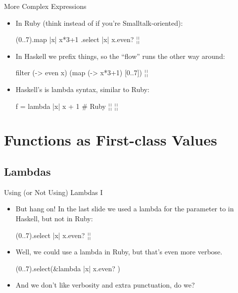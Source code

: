 \documentclass[xcolor=dvipsnames]{beamer}          %
\newcommand{\lO}[1]{\color{Black}{#1}}
\newcommand{\lH}[1]{\color{MidnightBlue}{#1}}
\begin{document}
\begin{frame}[fragile]{More Complex Expressions}
\begin{itemize}
    \item In Ruby (think  instead of  if you're
        Smalltalk-oriented):
        \begin{rlisting}
            (0..7).map { |x| x*3+1 } .select { |x| x.even? }
            ¦\lO{=> [4, 10, 16, 22]}¦
        \end{rlisting}
    \item In Haskell we prefix things, so the ``flow'' runs the other
        way around:
        \begin{hlisting}
            filter (\x -> even x) (map (\x -> x*3+1) [0..7])
            ¦\lO{[4,10,16,22]}¦
        \end{hlisting}
    \item Haskell's  is lambda syntax, similar to Ruby:
        \begin{rlisting}
            f = lambda { |x| x + 1 }     # Ruby
            ¦\lH{f = {\B}x -> x + 1}¦             ¦\lH{\HH Haskell}¦
        \end{rlisting}
\end{itemize}
\end{frame}


\section{Functions as First-class Values}

\subsection{Lambdas}

\begin{frame}[fragile]{Using (or Not Using) Lambdas I}
\begin{itemize}
    \item But hang on! In the last slide we used a lambda for the
        parameter to  in Haskell, but not in Ruby:
        \begin{rlisting}
            (0..7).select { |x| x.even? }
            ¦\lH{filter ({\B}x -> even x) [0..7]}¦
        \end{rlisting}
    \item Well, we could use a lambda in Ruby, but that's even more verbose.
        \begin{rlisting}
            (0..7).select(&lambda { |x| x.even? })
        \end{rlisting}
    \item And we don't like verbosity and extra punctuation, do we?
\end{itemize}
\end{frame}
\end{document}
